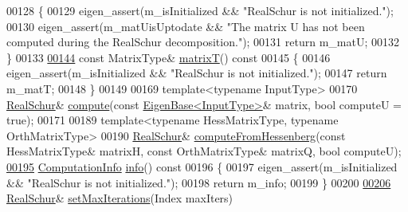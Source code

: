 \begin{DoxyCode}
00128 \textcolor{keyword}{    }\{
00129       eigen\_assert(m\_isInitialized && \textcolor{stringliteral}{"RealSchur is not initialized."});
00130       eigen\_assert(m\_matUisUptodate && \textcolor{stringliteral}{"The matrix U has not been computed during the RealSchur
       decomposition."});
00131       \textcolor{keywordflow}{return} m\_matU;
00132     \}
00133 
\hyperlink{group___eigenvalues___module_abb78996b43b8642a5f507415730445cb}{00144}     \textcolor{keyword}{const} MatrixType& \hyperlink{group___eigenvalues___module_abb78996b43b8642a5f507415730445cb}{matrixT}()\textcolor{keyword}{ const}
00145 \textcolor{keyword}{    }\{
00146       eigen\_assert(m\_isInitialized && \textcolor{stringliteral}{"RealSchur is not initialized."});
00147       \textcolor{keywordflow}{return} m\_matT;
00148     \}
00149   
00169     \textcolor{keyword}{template}<\textcolor{keyword}{typename} InputType>
00170     \hyperlink{group___eigenvalues___module_class_eigen_1_1_real_schur}{RealSchur}& \hyperlink{group___eigenvalues___module_a60caf9ffad11d728ea458c4dd36d0a98}{compute}(\textcolor{keyword}{const} \hyperlink{group___core___module_struct_eigen_1_1_eigen_base}{EigenBase<InputType>}& matrix, \textcolor{keywordtype}{bool} 
      computeU = \textcolor{keyword}{true});
00171 
00189     \textcolor{keyword}{template}<\textcolor{keyword}{typename} HessMatrixType, \textcolor{keyword}{typename} OrthMatrixType>
00190     \hyperlink{group___eigenvalues___module_class_eigen_1_1_real_schur}{RealSchur}& \hyperlink{group___eigenvalues___module_ac4acc917dcaddefae5f35acd2c536d65}{computeFromHessenberg}(\textcolor{keyword}{const} HessMatrixType& matrixH, \textcolor{keyword}{const} 
      OrthMatrixType& matrixQ,  \textcolor{keywordtype}{bool} computeU);
\hyperlink{group___eigenvalues___module_a386fd2b1a3a8401eca7183ac074deec8}{00195}     \hyperlink{group__enums_ga85fad7b87587764e5cf6b513a9e0ee5e}{ComputationInfo} \hyperlink{group___eigenvalues___module_a386fd2b1a3a8401eca7183ac074deec8}{info}()\textcolor{keyword}{ const}
00196 \textcolor{keyword}{    }\{
00197       eigen\_assert(m\_isInitialized && \textcolor{stringliteral}{"RealSchur is not initialized."});
00198       \textcolor{keywordflow}{return} m\_info;
00199     \}
00200 
\hyperlink{group___eigenvalues___module_ad189e8776ee20a12046694f98b354322}{00206}     \hyperlink{group___eigenvalues___module_class_eigen_1_1_real_schur}{RealSchur}& \hyperlink{group___eigenvalues___module_ad189e8776ee20a12046694f98b354322}{setMaxIterations}(Index maxIters)

\end{DoxyCode}
